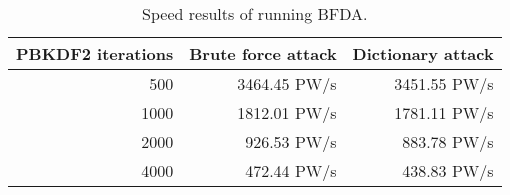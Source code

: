 \begin{table}[!h]
    \centering
    \caption{Speed results of running \ac{BFDA}. 
}
    \label{tab:res_bf}
    \begin{tabular}{| r | r | r |}
	\hline
	\ac{PBKDF2} iterations          &Brute force attack	    &Dictionary attack	\\
	\hline
	500                             &3464.45 PW/s                &3451.55 PW/s	\\
	\hline
	1000                            &1812.01 PW/s                &1781.11 PW/s	\\
	\hline
	2000                            &926.53 PW/s                 &883.78 PW/s	\\
	\hline
	4000                            &472.44 PW/s                 &438.83 PW/s	\\
	\hline
    \end{tabular}
\end{table}
